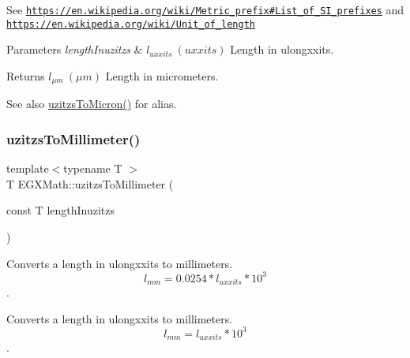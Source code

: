See \href{https://en.wikipedia.org/wiki/Metric_prefix#List_of_SI_prefixes}{\tt https\+://en.\+wikipedia.\+org/wiki/\+Metric\+\_\+prefix\#\+List\+\_\+of\+\_\+\+S\+I\+\_\+prefixes} and \href{https://en.wikipedia.org/wiki/Unit_of_length}{\tt https\+://en.\+wikipedia.\+org/wiki/\+Unit\+\_\+of\+\_\+length} 
\begin{DoxyParams}{Parameters}
{\em length\+Inuzitzs} & $ l_{uxxits}\ (uxxits)$ Length in ulongxxits. \\
\hline
\end{DoxyParams}
\begin{DoxyReturn}{Returns}
$ l_{\mu m}\ (\mu m)$ Length in micrometers. 
\end{DoxyReturn}
\begin{DoxySeeAlso}{See also}
\mbox{\hyperlink{group___e_g_x_math-_conversions-_length_conversions-_imperial-uzitzs-_non-_s_i_ga695a8fd8870537930d6378e99ad2aa9f}{uzitzs\+To\+Micron()}} for alias. 
\end{DoxySeeAlso}
\mbox{\label{group___e_g_x_math-_conversions-_length_conversions-_imperial-uzitzs-_s_i_gaf507dd646327861da523586b417d132e}} 
\subsubsection{\texorpdfstring{uzitzs\+To\+Millimeter()}{uzitzsToMillimeter()}}
{\footnotesize\ttfamily template$<$typename T $>$ \\
T E\+G\+X\+Math\+::uzitzs\+To\+Millimeter (\begin{DoxyParamCaption}\item[{const T}]{length\+Inuzitzs }\end{DoxyParamCaption})}



Converts a length in ulongxxits to millimeters. \[ l_{mm}=0.0254 * l_{uxxits} * 10^{3} \]. 

Converts a length in ulongxxits to millimeters. \[ l_{mm}=l_{uxxits} * 10^{3} \].

